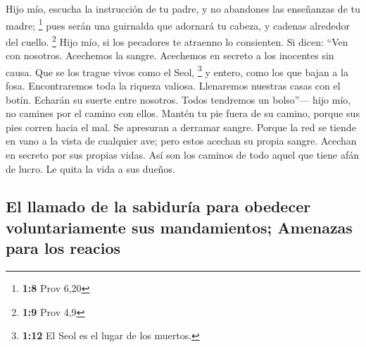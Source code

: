  Hijo mío, escucha la instrucción de tu padre, y no
abandones las enseñanzas de tu madre; \footnote{\textbf{1:8} Prov 6,20}
 pues serán una guirnalda que adornará tu cabeza, y
cadenas alrededor del cuello. \footnote{\textbf{1:9} Prov 4,9}
 Hijo mío, si los pecadores te atraenno lo consienten.
 Si dicen: ``Ven con nosotros. Acechemos la sangre.
Acechemos en secreto a los inocentes sin causa.  Que se
los trague vivos como el Seol, \footnote{\textbf{1:12} El Seol es el
  lugar de los muertos.} y entero, como los que bajan a la fosa.
 Encontraremos toda la riqueza valiosa. Llenaremos
nuestras casas con el botín.  Echarán su suerte entre
nosotros. Todos tendremos un bolso''---  hijo mío, no
camines por el camino con ellos. Mantén tu pie fuera de su camino,
 porque sus pies corren hacia el mal. Se apresuran a
derramar sangre.  Porque la red se tiende en vano a la
vista de cualquier ave;  pero estos acechan su propia
sangre. Acechan en secreto por sus propias vidas.  Así
son los caminos de todo aquel que tiene afán de lucro. Le quita la vida
a sus dueños.

\hypertarget{el-llamado-de-la-sabiduruxeda-para-obedecer-voluntariamente-sus-mandamientos-amenazas-para-los-reacios}{%
\subsection{El llamado de la sabiduría para obedecer voluntariamente sus
mandamientos; Amenazas para los
reacios}\label{el-llamado-de-la-sabiduruxeda-para-obedecer-voluntariamente-sus-mandamientos-amenazas-para-los-reacios}}

